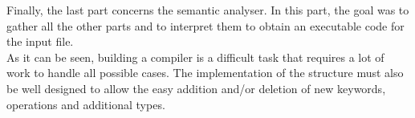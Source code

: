\documentclass{article}
\begin{document}
Finally, the last part concerns the semantic analyser. In this part, the goal was to gather all the other parts and to interpret them to obtain an executable code for the input file. \\

As it can be seen, building a compiler is a difficult task that requires a lot of work to handle all possible cases. The implementation of the structure must also be well designed to allow the easy addition and/or deletion of new keywords, operations and additional types.
\end{document}
